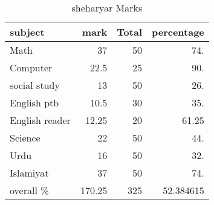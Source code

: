 \documentclass[11pt]{article}
\author{gnu}
\date{\today}
\title{}
\begin{document}
\tableofcontents

\begin{table}[htbp]
\caption{sheharyar Marks}
\begin{tabular}{lrrr}
\hline
subject & mark & Total & percentage\\
\hline
Math & 37 & 50 & 74.\\
Computer & 22.5 & 25 & 90.\\
social study & 13 & 50 & 26.\\
English ptb & 10.5 & 30 & 35.\\
English reader & 12.25 & 20 & 61.25\\
Science & 22 & 50 & 44.\\
Urdu & 16 & 50 & 32.\\
Islamiyat & 37 & 50 & 74.\\
\hline
overall \% & 170.25 & 325 & 52.384615\\
\hline
\end{tabular}
\end{table}
\end{document}
